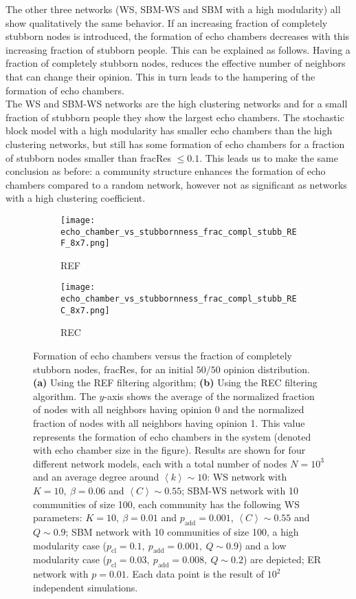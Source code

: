 \documentclass[11 pt , letterpaper , twoside , openright]{book}
\begin{document}
The other three networks (WS, SBM-WS and SBM with a high modularity) all show qualitatively the same behavior. If an increasing fraction of completely stubborn nodes is introduced, the formation of echo chambers decreases with this increasing fraction of stubborn people. This can be explained as follows. Having a fraction of completely stubborn nodes, reduces the effective number of neighbors that can change their opinion. This in turn leads to the hampering of the formation of echo chambers.\\
The WS and SBM-WS networks are the high clustering networks and for a small fraction of stubborn people they show the largest echo chambers. The stochastic block model with a high modularity has smaller echo chambers than the high clustering networks, but still has some formation of echo chambers for a fraction of stubborn nodes smaller than fracRes $\leqslant 0.1$. This leads us to make the same conclusion as before: a community structure enhances the formation of echo chambers compared to a random network, however not as significant as networks with a high clustering coefficient. \\
\begin{figure}[H]
  \begin{subfigure}[b]{0.49\textwidth}
  	\texttt{[image: echo\_chamber\_vs\_stubbornness\_frac\_compl\_stubb\_REF\_8x7.png]}
    \caption{REF}
  \end{subfigure}
  \begin{subfigure}[b]{0.49\textwidth}
  	\texttt{[image: echo\_chamber\_vs\_stubbornness\_frac\_compl\_stubb\_REC\_8x7.png]}
    \caption{REC}
    \label{REC_frac_compl_stubb}
  \end{subfigure}
  \captionsetup{format=plain}
  \caption[Formation of echo chambers versus fraction of completely stubborn nodes for the REF and REC filtering algorithms and an initial $50/50$ opinion distribution.]{Formation of echo chambers versus the fraction of completely stubborn nodes, fracRes, for an initial $50/50$ opinion distribution. \textbf{(a)} Using the REF filtering algorithm; \textbf{(b)} Using the REC filtering algorithm. The $y$-axis shows the average of the normalized fraction of nodes with all neighbors having opinion 0 and the normalized fraction of nodes with all neighbors having opinion 1. This value represents the formation of echo chambers in the system (denoted with echo chamber size in the figure). Results are shown for four different network models, each with a total number of nodes $N=10^3$ and an average degree around $\left<k\right> \sim 10$: WS network with $K =10,\ \beta = 0.06$ and $\left<C\right> \sim 0.55$; SBM-WS network with 10 communities of size 100, each community has the following WS parameters: $K = 10,\ \beta = 0.01$ and $p_{\text{add}} = 0.001$, $\left<C\right> \sim 0.55$ and $Q \sim 0.9$; SBM network with 10 communities of size 100, a high modularity case ($p_{\text{cl}} = 0.1,\ p_{\text{add}} = 0.001,\ Q \sim 0.9$) and a low modularity case ($p_{\text{cl}} = 0.03,\ p_{\text{add}} = 0.008,\ Q \sim 0.2$) are depicted; ER network with $p= 0.01$. Each data point is the result of $10^2$ independent simulations.}
\label{echo_vs_frac_complStubb_REF-REC}
\end{figure}
\end{document}

